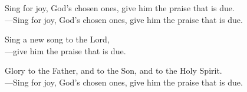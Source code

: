 \responsory

\noindent Sing for joy, God’s chosen ones, give him the praise that is due.\\
{\color{red}---\thinspace}Sing for joy, God’s chosen ones, give him the praise that is due.

\medskip\noindent Sing a new song to the Lord,\\
{\color{red}---\thinspace}give him the praise that is due.

\medskip\noindent Glory to the Father, and to the Son, and to the Holy Spirit.\\
{\color{red}---\thinspace}Sing for joy, God’s chosen ones, give him the praise that is due.